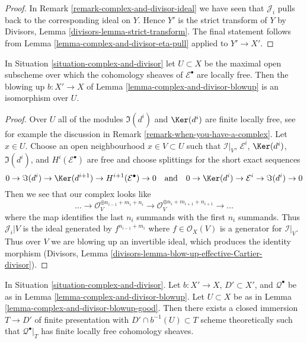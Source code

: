 \begin{proof}
In Remark \ref{remark-complex-and-divisor-ideal} we have seen that
$\mathcal{J}_i$ pulls back to the corresponding ideal on $Y$. Hence
$Y'$ is the strict transform of $Y$ by
Divisors, Lemma \ref{divisors-lemma-strict-transform}.
The final statement follows from
Lemma \ref{lemma-complex-and-divisor-eta-pull}
applied to $Y' \to X'$.
\end{proof}

\begin{lemma}
\label{lemma-complex-and-divisor-blowup-good}
In Situation \ref{situation-complex-and-divisor} let $U \subset X$
be the maximal open subscheme over which the cohomology sheaves
of $\mathcal{E}^\bullet$ are locally free. Then the blowing up
$b : X' \to X$
of Lemma \ref{lemma-complex-and-divisor-blowup} is an isomorphism
over $U$.
\end{lemma}

\begin{proof}
Over $U$ all of the modules $\Im(d^i)$ and $\Ker(d^i)$ are finite
locally free, see for example the discussion in
Remark \ref{remark-when-you-have-a-complex}.
Let $x \in U$. Choose an open neighbourhood $x \in V \subset U$
such that $\mathcal{I}|_V$, $\mathcal{E}^i$, $\Ker(d^i)$, $\Im(d^i)$,
and $H^i(\mathcal{E}^\bullet)$
are free and choose splittings for the short exact sequences
$$
0 \to \Im(d^i) \to \Ker(d^{i + 1}) \to H^{i + 1}(\mathcal{E}^\bullet) \to 0
\quad\text{and}\quad
0 \to \Ker(d^i) \to \mathcal{E}^i \to \Im(d^i) \to 0
$$
Then we see that our complex looks like
$$
\ldots \to
\mathcal{O}_V^{\oplus n_{i - 1} + m_i + n_i} \to
\mathcal{O}_V^{\oplus n_i + m_{i + 1} + n_{i + 1}} \to \ldots
$$
where the map identifies the last $n_i$ summands with the first
$n_i$ summands. Thus $\mathcal{J}_i|V$ is the ideal generated by
$f^{n_{i - 1} + m_i}$ where $f \in \mathcal{O}_X(V)$
is a generator for $\mathcal{I}|_V$. Thus over $V$ we are blowing up
an invertible ideal, which produces the identity morphism
(Divisors, Lemma \ref{divisors-lemma-blow-up-effective-Cartier-divisor}).
\end{proof}

\begin{lemma}
\label{lemma-complex-and-divisor-blowup-T}
In Situation \ref{situation-complex-and-divisor}. Let $b : X' \to X$,
$D' \subset X'$, and $\mathcal{Q}^\bullet$ be as in
Lemma \ref{lemma-complex-and-divisor-blowup}.
Let $U \subset X$ be as in Lemma \ref{lemma-complex-and-divisor-blowup-good}.
Then there exists a closed immersion $T \to D'$ of finite presentation
with $D' \cap b^{-1}(U) \subset T$ scheme theoretically
such that $\mathcal{Q}^\bullet|_T$ has finite locally free cohomology sheaves.
\end{lemma}

